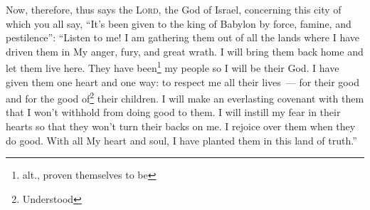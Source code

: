 
\begin{inparaenum}
    
    
    
     Now, therefore, thus says the \textsc{Lord}, the God of Israel, concerning this city of which you all say, ``It's been given to the king of Babylon by force, famine, and pestilence'':%
     ``Listen to me! I am gathering them out of all the lands where I have driven them in My anger, fury, and great wrath. I will bring them back home and let them live here.%
     They have been\footnote{alt., proven themselves to be} my people so I will be their God.%
     I have given them one heart and one way: to respect me all their lives~--- for their good and for the good of\footnote{Understood} their children.%
     I will make an everlasting covenant with them that I won't withhold from doing good to them. I will instill my fear in their hearts so that they won't turn their backs on me.%
     I rejoice over them when they do good. With all My heart and soul, I have planted them in this land of truth.''%
    
\end{inparaenum}
